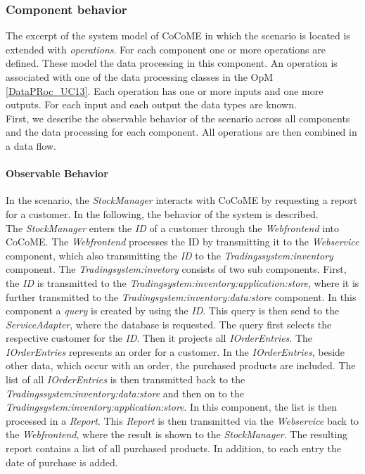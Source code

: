 \subsubsection{Component behavior}
The excerpt of the system model of CoCoME in which the scenario is located is extended with \textit{operations}. For each component one or more operations are defined. These model the data processing in this component. An operation is associated with one of the data processing classes in the OpM \autoref{DataPRoc_UC13}. Each operation has one or more inputs and one more outputs. For each input and each output the data types are known. \\
First, we describe the observable behavior of the scenario across all components and the data processing for each component. All operations are then combined in a data flow.
\paragraph{Observable Behavior}
In the scenario, the \textit{StockManager} interacts with CoCoME by requesting a report for a customer. In the following, the behavior of the system  is described.\\
The \textit{StockManager} enters the \textit{ID} of a customer through the \textit{Webfrontend} into CoCoME. The \textit{Webfrontend} processes the ID by transmitting it to the \textit{Webservice} component, which also transmitting the \textit{ID} to the \textit{Tradingssystem:inventory} component. The \textit{Tradingsystem:invetory} consists of two sub components. First, the \textit{ID} is transmitted to the \textit{Tradingsystem:inventory:application:store}, where it is further transmitted to the \textit{Tradingsystem:inventory:data:store} component. In this component a \textit{query} is created by using the \textit{ID}. This query is then send to the \textit{ServiceAdapter}, where the database is requested. The query first selects the respective customer for the \textit{ID}. Then it projects all \textit{IOrderEntries}. The \textit{IOrderEntries} represents an order for a customer. In the \textit{IOrderEntries}, beside other data, which occur with an order, the purchased products are included. The list of all \textit{IOrderEntries} is then transmitted back to the \textit{Tradingssystem:inventory:data:store} and then on to the \textit{Tradingsystem:inventory:application:store}. In this component, the list is then processed in a \textit{Report}. This \textit{Report} is then transmitted via the \textit{Webservice} back to the \textit{Webfrontend}, where the result is shown to the \textit{StockManager}. The resulting report contains a list of all purchased products. In addition, to each entry the date of purchase is added.
